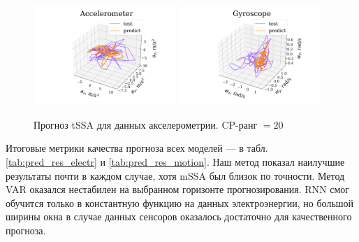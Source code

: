 			\begin{figure}[h]
				\centering
				\includegraphics[width=0.48\textwidth, keepaspectratio]{../experiments/motion_1/tssa/figs/prediction/cpd_rank_20/acceler.png}
				\includegraphics[width=0.48\textwidth, keepaspectratio]{../experiments/motion_1/tssa/figs/prediction/cpd_rank_20/gyro.png}
				\caption{Прогноз tSSA для данных акселерометрии. CP-ранг $ = 20 $}\label{fig:tssa_motion_pred}
			\end{figure}
			
			Итоговые метрики качества прогноза всех моделей --- в табл. \ref{tab:pred_res_electr} и \ref{tab:pred_res_motion}. Наш метод показал наилучшие результаты почти в каждом случае, хотя mSSA был близок по точности. Метод VAR оказался нестабилен на выбранном горизонте прогнозирования. RNN смог обучится только в константную функцию на данных электроэнергии, но большой ширины окна в случае данных сенсоров оказалось достаточно для качественного прогноза.

